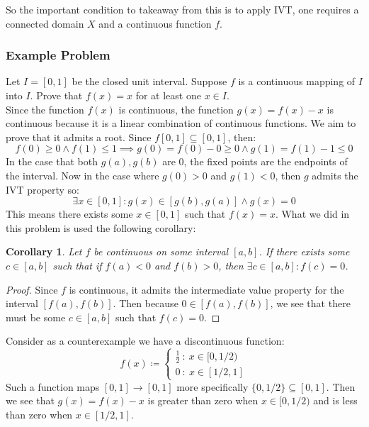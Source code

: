 \documentclass[10pt,letterpaper]{article} %
\newtheorem{cor}{Corollary}[section]
\begin{document}
So the important condition to takeaway from this is to apply IVT, one requires a connected domain $X$ and a continuous function $f$. 

\medskip
\subsubsection{Example Problem}
Let $I = [0, 1]$ be the closed unit interval. Suppose $f$ is a continuous mapping of $I$ into $I$. Prove that $f(x) = x$ for at least one $x \in I$.\\

Since the function $f(x)$ is continuous, the function $g(x) = f(x) - x$ is continuous because it is a linear combination of continuous functions. We aim to prove that it admits a root. Since $f[0, 1] \subseteq [0, 1]$, then:
\begin{equation*}
f(0) \geqslant 0 \land f(1) \leqslant 1 \implies g(0) = f(0) - 0 \geqslant 0 \land g(1) = f(1) - 1 \leqslant 0
\end{equation*}
In the case that both $g(a), g(b)$ are 0, the fixed points are the endpoints of the interval. Now in the case where $g(0) > 0$ and $g(1) < 0$, then $g$ admits the IVT property so:
\begin{equation*}
\exists x \in [0, 1]: g(x) \in [g(b), g(a)] \land g(x) = 0
\end{equation*}
This means there exists some $x \in [0, 1]$ such that $f(x) = x$. What we did in this problem is used the following corollary:
\begin{cor}
Let $f$ be continuous on some interval $[a, b]$. If there exists some $c \in [a, b]$ such that if $f(a) < 0$ and $f(b) > 0$, then $\exists c \in [a, b]: f(c) = 0$.
\end{cor}
\begin{proof}
Since $f$ is continuous, it admits the intermediate value property for the interval $[f(a), f(b)]$. Then because $0 \in [f(a), f(b)]$, we see that there must be some $c \in [a, b]$ such that $f(c) = 0$.
\end{proof}

Consider as a counterexample we have a discontinuous function:
\begin{equation*}
f(x) \coloneq \begin{cases*}
  \frac{1}{2} \ : \ x \in [0, 1/2)\\
  0 \ : \ x \in [1/2, 1]
\end{cases*}
\end{equation*}
Such a function maps $[0, 1] \xrightarrow{} [0, 1]$ more specifically $\{0, 1/2\} \subseteq [0, 1]$. Then we see that $g(x) = f(x) - x$ is greater than zero when $x \in [0, 1/2)$ and is less than zero when $x \in [1/2, 1]$.\\
\end{document}
